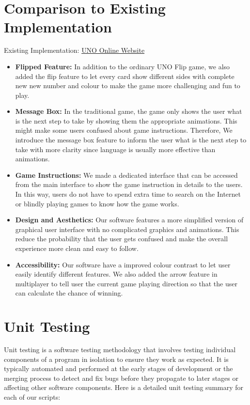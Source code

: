 \documentclass[12pt, titlepage]{article}
\begin{document}
\section{Comparison to Existing Implementation}
Existing Implementation: \href{https://unoonline.io/}{UNO Online Website}
\begin{itemize}
    \item \textbf{Flipped Feature:}
    In addition to the ordinary UNO Flip game, we also added the flip feature to let every card show different sides with complete new new number and colour to make the game more challenging and fun to play.
    \item \textbf{Message Box:} In the traditional game, the game only shows the user what is the next step to take by showing them the appropriate animations. This might make some users confused about game instructions. Therefore, We introduce the message box feature to inform the user what is the next step to take with more clarity since language is usually more effective than animations.
    \item \textbf{Game Instructions:} We made a dedicated interface that can be accessed from the main interface to show the game instruction in details to the users. In this way, users do not have to spend extra time to search on the Internet or blindly playing games to know how the game works.
    \item \textbf{Design and Aesthetics:} Our software features a more simplified version of graphical user interface with no complicated graphics and animations. This reduce the probability that the user gets confused and make the overall experience more clean and easy to follow.
    \item \textbf{Accessibility:} Our software have a improved colour contrast to let user easily identify different features. We also added the arrow feature in multiplayer to tell user the current game playing direction so that the user can calculate the chance of winning. 
\end{itemize}

\section{Unit Testing}
Unit testing is a software testing methodology that involves testing individual components of a program in isolation to ensure they work as expected. It is typically automated and performed at the early stages of development or the merging process to detect and fix bugs before they propagate to later stages or affecting other software components. Here is a detailed unit testing summary for each of our scripts:
\end{document}
